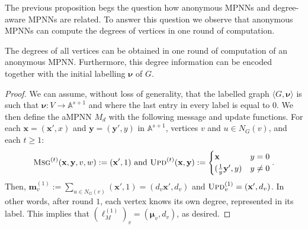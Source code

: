 The previous proposition begs the question how anonymous MPNNs and degree-aware MPNNs are related. To answer this question we observe that anonymous MPNNs can compute the degrees of vertices in one round of computation.

\begin{lemma}
	The degrees of all vertices can be obtained in one round of computation of an anonymous MPNN. Furthermore, this degree information can be encoded together with the initial labelling $\pmb{\nu}$ of $G$.
	\end{lemma}
\begin{proof}
We can assume, without loss of generality, that the labelled graph $\langle G,\pmb{\nu}\rangle$ is such that
$\pmb{\nu}:V\to\mathbb{A}^{s+1}$ and where the last entry in every label is equal to $0$.
We then define the aMPNN
$M_d$ with the following message and update functions.
For each $\mathbf{x}=(\mathbf{x}',x)$ and $\mathbf{y}=(\mathbf{y}',y)$ in $\mathbb{A}^{s+1}$, vertices $v$ and $u\in N_G(v)$, and each $t\geq 1$:
$$
\textsc{Msg}^{(t)}(\mathbf{x},\mathbf{y},v,w):=(\mathbf{x}',1)
\text{ and } \textsc{Upd}^{(t)}(\mathbf{x},\mathbf{y}):=
\begin{cases}
\mathbf{x} & y=0\\
(\frac{1}{y}\mathbf{y}',y) & y\neq 0
\end{cases}.
$$
Then,
$
\mathbf{m}_v^{(1)}:=\sum_{u\in N_G(v)}(\mathbf{x}',1)=(d_v\mathbf{x}',d_v)
$ and $\textsc{Upd}^{(1)}_v=(\mathbf{x}',d_v)$.
In other words, after round $1$, each vertex knows its own degree, represented in its label. This implies that
$(\pmb{\ell}_M^{(1)})_v=(\pmb{\mu}_v,d_v)$, as desired.
\end{proof}


